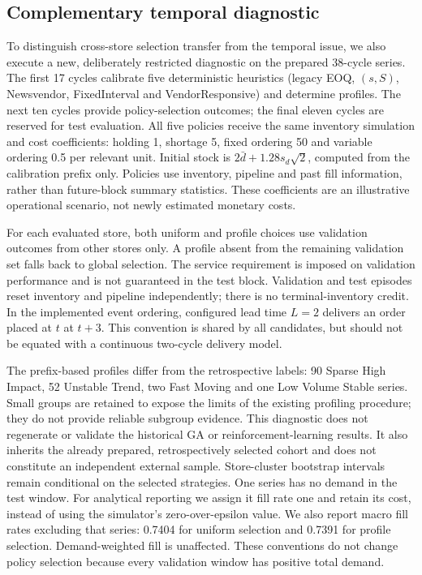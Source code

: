 \documentclass[preprint,12pt]{elsarticle}
\begin{document}
\subsection{Complementary temporal diagnostic}
To distinguish cross-store selection transfer from the temporal issue, we also execute a new, deliberately restricted diagnostic on the prepared 38-cycle series. The first 17 cycles calibrate five deterministic heuristics (legacy EOQ, $(s,S)$, Newsvendor, FixedInterval and VendorResponsive) and determine profiles. The next ten cycles provide policy-selection outcomes; the final eleven cycles are reserved for test evaluation. All five policies receive the same inventory simulation and cost coefficients: holding 1, shortage 5, fixed ordering 50 and variable ordering 0.5 per relevant unit. Initial stock is $2\bar d+1.28s_d\sqrt{2}$, computed from the calibration prefix only. Policies use inventory, pipeline and past fill information, rather than future-block summary statistics. These coefficients are an illustrative operational scenario, not newly estimated monetary costs.

For each evaluated store, both uniform and profile choices use validation outcomes from other stores only. A profile absent from the remaining validation set falls back to global selection. The service requirement is imposed on validation performance and is not guaranteed in the test block. Validation and test episodes reset inventory and pipeline independently; there is no terminal-inventory credit. In the implemented event ordering, configured lead time $L=2$ delivers an order placed at $t$ at $t+3$. This convention is shared by all candidates, but should not be equated with a continuous two-cycle delivery model.

The prefix-based profiles differ from the retrospective labels: 90 Sparse High Impact, 52 Unstable Trend, two Fast Moving and one Low Volume Stable series. Small groups are retained to expose the limits of the existing profiling procedure; they do not provide reliable subgroup evidence. This diagnostic does not regenerate or validate the historical GA or reinforcement-learning results. It also inherits the already prepared, retrospectively selected cohort and does not constitute an independent external sample. Store-cluster bootstrap intervals remain conditional on the selected strategies. One series has no demand in the test window. For analytical reporting we assign it fill rate one and retain its cost, instead of using the simulator's zero-over-epsilon value. We also report macro fill rates excluding that series: 0.7404 for uniform selection and 0.7391 for profile selection. Demand-weighted fill is unaffected. These conventions do not change policy selection because every validation window has positive total demand.
\end{document}
